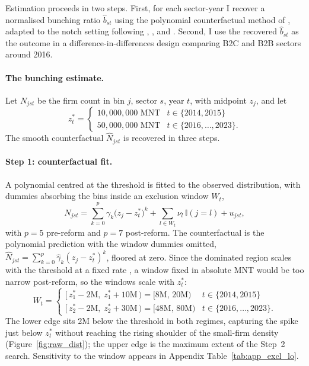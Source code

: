 \documentclass[12pt,oneside,a4paper]{report}
\begin{document}
Estimation proceeds in two steps. First, for each sector-year I recover a normalised bunching ratio $\hat{b}_{st}$ using the polynomial counterfactual method of \textcite{chetty2011adjustment}, adapted to the notch setting following \textcite{kleven2013using}, \textcite{harju2019compliance}, and \textcite{liu2021vat}. Second, I use the recovered $\hat{b}_{st}$ as the outcome in a difference-in-differences design comparing B2C and B2B sectors around 2016.

\paragraph{The bunching estimate.} Let $N_{jst}$ be the firm count in bin $j$, sector $s$, year $t$, with midpoint $z_j$, and let
\begin{equation}
z^*_t =
\begin{cases}
10{,}000{,}000 \text{ MNT} & t \in \{2014, 2015\} \\
50{,}000{,}000 \text{ MNT} & t \in \{2016, \dots, 2023\}.
\end{cases}
\end{equation}
The smooth counterfactual $\hat{N}_{jst}$ is recovered in three steps.

\paragraph{Step 1: counterfactual fit.}
A polynomial centred at the threshold is fitted to the observed distribution, with dummies absorbing the bins inside an exclusion window $W_t$,
\begin{equation}
N_{jst} = \sum_{k=0}^{p}\gamma_k\bigl(z_j - z^*_t\bigr)^{k}
         + \sum_{l \in W_t}\nu_l\,\mathbb{I}(j = l)
         + u_{jst},
\label{eq:poly_fit}
\end{equation}
with $p = 5$ pre-reform and $p = 7$ post-reform. The counterfactual is the polynomial prediction with the window dummies omitted, $\hat{N}_{jst} = \sum_{k=0}^{p}\hat{\gamma}_k(z_j - z^*_t)^{k}$, floored at zero. Since the dominated region scales with the threshold at a fixed rate \parencite{kleven2013using}, a window fixed in absolute MNT would be too narrow post-reform, so the windows scale with $z^*_t$:
\begin{equation}
W_t =
\begin{cases}
[\,z^*_1 - 2\text{M},\; z^*_1 + 10\text{M}\,) = [8\text{M},\, 20\text{M}) & t \in \{2014, 2015\} \\[4pt]
[\,z^*_2 - 2\text{M},\; z^*_2 + 30\text{M}\,) = [48\text{M},\, 80\text{M}) & t \in \{2016,\dots,2023\}.
\end{cases}
\label{eq:window}
\end{equation}
The lower edge sits 2M below the threshold in both regimes, capturing the spike just below $z^*_t$ without reaching the rising shoulder of the small-firm density (Figure~\ref{fig:raw_dist}); the upper edge is the maximum extent of the Step~2 search. Sensitivity to the window appears in Appendix Table~\ref{tab:app_excl_lo}.
\end{document}
